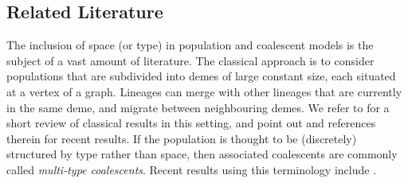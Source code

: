 \documentclass[reqno,draft]{amsart}
\numberwithin{equation}{section}
\theoremstyle{plain}
\theoremstyle{remark}
\newtheorem{remark}[theorem]{Remark}
\newcommand{\N}{\mathbb{N}} %
\newcommand{\fpart}{\Pi} %
\begin{document}
%

\subsection{Related Literature}\label{sec:relatedliterature}
The inclusion of space (or type) in population and coalescent models is the subject of a vast amount of literature. The classical approach is to consider populations that are subdivided into demes of large constant size, each situated at a vertex of a graph. Lineages can merge with other lineages that are currently in the same deme, and migrate between neighbouring demes. We refer to \cite{EBV2010} for a short review of classical results in this setting, and point out \cite{spatiallambda,smith2021} and references therein for recent results. If the population is thought to be (discretely) structured by type rather than space, then associated coalescents are commonly called \emph{multi-type coalescents}. Recent results using this terminology include \cite{multitypelambda,canningsmultitype,multitypepoisson}.
\end{document}
